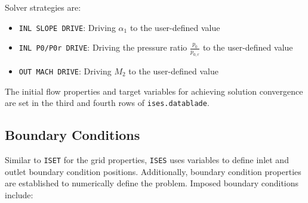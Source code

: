 Solver strategies are:

\begin{itemize}
    \item \texttt{INL SLOPE DRIVE}: Driving $\alpha_1$ to the user-defined value
    \item \texttt{INL P0/P0r DRIVE}: Driving the pressure ratio $\frac{p_0}{p_{0,r}}$ to the user-defined value
    \item \texttt{OUT MACH DRIVE}: Driving $M_2$ to the user-defined value
\end{itemize}

The initial flow properties and target variables for achieving solution convergence are set in the third and fourth rows of \texttt{ises.datablade}.

\subsection{Boundary Conditions}





Similar to \texttt{ISET} for the grid properties, \texttt{ISES} uses variables to define inlet and outlet boundary condition positions. Additionally, boundary condition properties are established to numerically define the problem. 
Imposed boundary conditions include:

